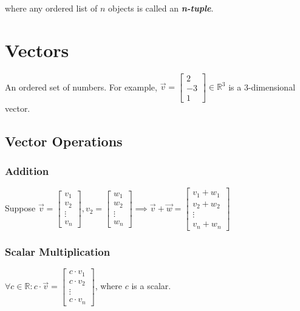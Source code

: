 \documentclass{article}
\begin{document}
\noindent where any ordered list of $n$ objects is called an \textbf{\textit{n-tuple}}.

\section{Vectors}
An ordered set of numbers. For example, $\vec{v} = \begin{bmatrix}
    2 \\ -3 \\ 1
\end{bmatrix} \in \mathbb{R}^3$ is a 3-dimensional vector. 


\subsection{Vector Operations}

\subsubsection{Addition}
Suppose $\vec{v} = \begin{bmatrix}
    v_{1} \\ v_{2} \\ \vdots \\ v_n 
\end{bmatrix}, v_{2} = \begin{bmatrix}
    w_{1} \\ w_{2} \\ \vdots \\ w_n
\end{bmatrix} \implies \vec{v} + \vec{w} = \begin{bmatrix}
    v_{1} + w_{1} \\ v_{2} + w_{2} \\ \vdots \\ v_n + w_n
\end{bmatrix}$ \\

\subsubsection{Scalar Multiplication}
$\forall c \in \mathbb{R}: c \cdot \vec{v} = \begin{bmatrix}
    c \cdot v_{1} \\ c \cdot v_{2} \\ \vdots \\ c \cdot v_n
\end{bmatrix}$, where $c$ is a scalar. 
\end{document}
